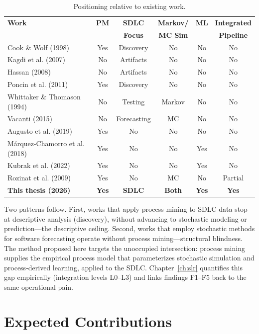 \begin{table}[htbp]
\centering
\caption{Positioning relative to existing work.}
\label{tab:related-surveys}
\footnotesize
\begin{tabular}{lccccc}
\toprule
\textbf{Work} & \textbf{PM} & \textbf{SDLC} & \textbf{Markov/} & \textbf{ML} & \textbf{Integrated} \\
 & & \textbf{Focus} & \textbf{MC Sim} & & \textbf{Pipeline} \\
\midrule
Cook \& Wolf (1998) & Yes & Discovery & No & No & No \\
Kagdi et al. (2007) & No & Artifacts & No & No & No \\
Hassan (2008) & No & Artifacts & No & No & No \\
Poncin et al. (2011) & Yes & Discovery & No & No & No \\
Whittaker \& Thomason (1994) & No & Testing & Markov & No & No \\
Vacanti (2015) & No & Forecasting & MC & No & No \\
Augusto et al. (2019) & Yes & No & No & No & No \\
Márquez-Chamorro et al. (2018) & Yes & No & No & Yes & No \\
Kubrak et al. (2022) & Yes & No & No & Yes & No \\
Rozinat et al. (2009) & Yes & No & MC & No & Partial \\
\textbf{This thesis (2026)} & \textbf{Yes} & \textbf{SDLC} & \textbf{Both} & \textbf{Yes} & \textbf{Yes} \\
\bottomrule
\end{tabular}
\end{table}

Two patterns follow.
First, works that apply process mining to SDLC data stop at descriptive
analysis (discovery), without advancing to stochastic modeling or
prediction---the descriptive ceiling.
Second, works that employ stochastic methods for software forecasting
operate without process mining---structural blindness.
The method proposed here targets the unoccupied intersection: process
mining supplies the empirical process model that parameterizes stochastic
simulation and process-derived learning, applied to the SDLC.
Chapter~\ref{ch:slr} quantifies this gap empirically (integration levels
L0--L3) and links findings F1--F5 back to the same operational pain.


\section{Expected Contributions}
\label{sec:contributions}

